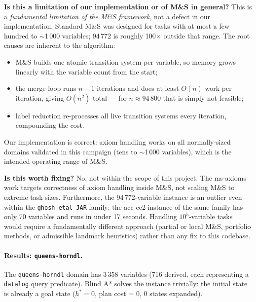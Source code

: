 \documentclass[11pt,a4paper]{article}
\begin{document}
\begin{itemize}
    \textbf{Is this a limitation of our implementation or of M\&S in general?}
    This is a \emph{fundamental limitation of the M\&S framework}, not a
    defect in our implementation.  Standard M\&S was designed for tasks
    with at most a few hundred to $\sim$1\,000 variables; 94\,772 is
    roughly 100$\times$ outside that range.  The root causes are inherent
    to the algorithm:
    \begin{itemize}
      \item M\&S builds one atomic transition system per variable, so
            memory grows linearly with the variable count from the start;
      \item the merge loop runs $n - 1$ iterations and does at least
            $O(n)$ work per iteration, giving $O(n^2)$ total — for
            $n \approx 94\,800$ that is simply not feasible;
      \item label reduction re-processes all live transition systems
            every iteration, compounding the cost.
    \end{itemize}
    Our implementation is correct: axiom handling works on all
    normally-sized domains validated in this campaign (tens to $\sim$1\,000
    variables), which is the intended operating range of M\&S.

    \textbf{Is this worth fixing?}  No, not within the scope of this
    project.  The ms-axioms work targets correctness of axiom handling
    inside M\&S, not scaling M\&S to extreme task sizes.  Furthermore,
    the 94\,772-variable instance is an outlier even within the
    \texttt{ghosh-etal-JAR} family: the acc-cc2 instance of the same
    family has only 70 variables and runs in under 17 seconds.  Handling
    $10^5$-variable tasks would require a fundamentally different
    approach (partial or local M\&S, portfolio methods, or admissible
    landmark heuristics) rather than any fix to this codebase.
\end{itemize}

    \paragraph{Results: \texttt{queens-horndl}.}

    The \texttt{queens-horndl} domain has 3\,358 variables (716 derived,
    each representing a \texttt{datalog} query predicate).  Blind A*
    solves the instance trivially: the initial state is already a goal
    state ($h^* = 0$, plan cost = 0, 0 states expanded).
\end{document}
